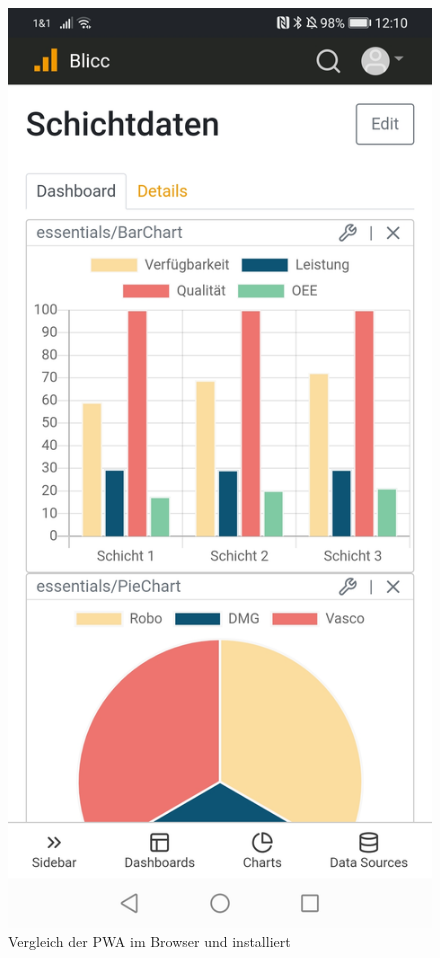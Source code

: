 \begin{figure}[h]
    \includegraphics[scale=0.15]{img/android/Installed}
    \caption{Vergleich der PWA im Browser und installiert}
\end{figure}

